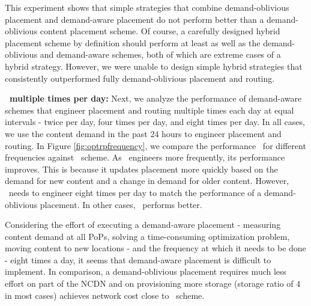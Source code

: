 

This experiment shows that simple strategies that combine demand-oblivious placement and demand-aware placement do not perform better than a demand-oblivious content placement scheme. Of course, a carefully designed hybrid placement scheme by definition should perform at least as well as the demand-oblivious and demand-aware schemes, both of which are extreme cases of a hybrid strategy. However, we were unable to design simple hybrid strategies that consistently outperformed fully demand-oblivious placement and routing.





\textbf{\optrp\ multiple times per day:} Next, we analyze the performance of demand-aware schemes that engineer placement and routing multiple times each day at equal intervals - twice per day, four times per day, and eight times per day. In all cases, we use the content demand in the past 24 hours to engineer placement and routing. In Figure \ref{fig:optrpfrequency}, we compare the performance \optrp\ for different frequencies against \invlru\ scheme. As \optrp\ engineers more frequently, its performance improves. This is because it updates placement more quickly based on the demand for new content and a change in demand for older content. However, \optrp\ needs to engineer eight times per day to match the performance of a demand-oblivious placement. In other cases, \invlru\ performs better.
 
Considering the effort of executing a demand-aware placement - measuring content demand at all PoPs, solving a time-consuming optimization problem, moving content to new locations - and the frequency at which it needs to be done - eight times a day, it seems that demand-aware placement is difficult to implement. In comparison, a demand-oblivious placement requires much less effort on part of the NCDN and on provisioning more storage (storage ratio of 4 in most cases) achieves network cost close to \optrpfuture\ scheme.


